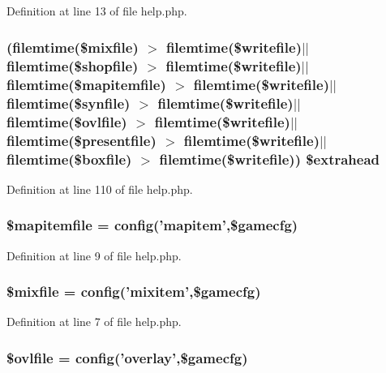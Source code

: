 Definition at line 13 of file help.\+php.

\hypertarget{help_8php_a25b60a75d1998e24b8be08f5191f731f}{
\subsubsection[{\$extrahead}]{ (filemtime(\$mixfile) $>$ filemtime(\$writefile)$\vert$$\vert$filemtime(\$shopfile) $>$ filemtime(\$writefile)$\vert$$\vert$filemtime(\$mapitemfile) $>$ filemtime(\$writefile)$\vert$$\vert$filemtime(\$synfile) $>$ filemtime(\$writefile)$\vert$$\vert$filemtime(\$ovlfile) $>$ filemtime(\$writefile)$\vert$$\vert$filemtime(\$presentfile) $>$ filemtime(\$writefile)$\vert$$\vert$filemtime(\$boxfile) $>$ filemtime(\$writefile)) \$extrahead}}\label{help_8php_a25b60a75d1998e24b8be08f5191f731f}


Definition at line 110 of file help.\+php.

\hypertarget{help_8php_a7d4a07d88fbf7598d1afe480b8e49aff}{
\subsubsection[{\$mapitemfile}]{\setlength{\rightskip}{0pt plus 5cm}\$mapitemfile = {\bf config}('mapitem',\$gamecfg)}}\label{help_8php_a7d4a07d88fbf7598d1afe480b8e49aff}


Definition at line 9 of file help.\+php.

\hypertarget{help_8php_affc0dbcabcc950d3d33132839350597f}{
\subsubsection[{\$mixfile}]{\setlength{\rightskip}{0pt plus 5cm}\$mixfile = {\bf config}('mixitem',\$gamecfg)}}\label{help_8php_affc0dbcabcc950d3d33132839350597f}


Definition at line 7 of file help.\+php.

\hypertarget{help_8php_adde37beebc46284ae993bf4053074066}{
\subsubsection[{\$ovlfile}]{\setlength{\rightskip}{0pt plus 5cm}\$ovlfile = {\bf config}('overlay',\$gamecfg)}}\label{help_8php_adde37beebc46284ae993bf4053074066}


